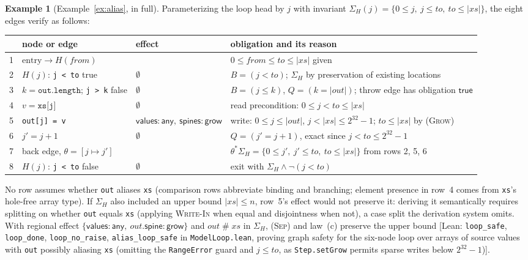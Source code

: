 \documentclass[10pt,a4paper]{article}
\theoremstyle{definition}
\newtheorem{example}[theorem]{Example}
\theoremstyle{remark}
\newcommand{\sep}{\mathrel{\#}}
\newcommand{\kw}[1]{\mathsf{#1}}
\newcommand{\grow}{\kw{grow}}
\newcommand{\any}{\kw{any}}
\newcommand{\val}{\kw{values}}
\newcommand{\st}{\kw{spines}}
\newcommand{\len}[1]{|#1|}
\newcommand{\code}[1]{\texttt{#1}}
\newcommand{\lean}[1]{\texttt{\small #1}}
\newcommand{\status}[1]{\textsf{\small[#1]}}
\begin{document}
\begin{example}[Example~\ref{ex:alias}, in full]\label{ex:full}
Parameterizing the loop head by $j$ with invariant
$\Sigma_H(j)=\{0\le j,\ j\le\mathit{to},\ \mathit{to}\le\len{\mathit{xs}}\}$,
the eight edges verify as follows:
{\footnotesize
\begin{center}
\begin{tabularx}{\linewidth}{@{}rll>{\raggedright\arraybackslash}X@{}}
\toprule
 & node or edge & effect & obligation and its reason\\
\midrule
1 & $\text{entry}\to H(\mathit{from})$ & & $0\le\mathit{from}\le\mathit{to}\le\len{\mathit{xs}}$ given\\
2 & $H(j)$: \code{j < to} true & $\emptyset$ & $B=(j<\mathit{to})$; $\Sigma_H$ by preservation of existing locations\\
3 & $k=\code{out.length}$; \code{j > k} false & $\emptyset$ & $B=(j\le k)$, $Q=(k=\len{\mathit{out}})$; throw edge has obligation $\kw{true}$\\
4 & $v=\code{xs[j]}$ & $\emptyset$ & read precondition: $0\le j<\mathit{to}\le\len{\mathit{xs}}$\\
5 & \code{out[j] = v} & $\val{:}\any,\ \st{:}\grow$ & write: $0\le j\le\len{\mathit{out}}$, $j<\len{\mathit{xs}}\le 2^{32}-1$; $\mathit{to}\le\len{\mathit{xs}}$ by \textsc{(Grow)}\\
6 & $j'=j+1$ & $\emptyset$ & $Q=(j'=j+1)$, exact since $j<\mathit{to}\le 2^{32}-1$\\
7 & back edge, $\theta=[j\mapsto j']$ & & $\theta^{*}\Sigma_H=\{0\le j',\ j'\le\mathit{to},\ \mathit{to}\le\len{\mathit{xs}}\}$ from rows 2, 5, 6\\
8 & $H(j)$: \code{j < to} false & $\emptyset$ & exit with $\Sigma_H\wedge\neg(j<\mathit{to})$\\
\bottomrule
\end{tabularx}
\end{center}}
\noindent
No row assumes whether \code{out} aliases \code{xs} (comparison rows
abbreviate binding and branching; element presence in row~4 comes from
\code{xs}'s hole-free array type). If $\Sigma_H$ also included an upper
bound $\len{\mathit{xs}}\le n$, row~5's effect would not preserve it:
deriving it semantically requires splitting on whether \code{out} equals
\code{xs} (applying \textsc{Write-In} when equal and disjointness when
not), a case split the derivation system omits. With regional effect
$\{\val:\any,\ \mathit{out}.\kw{spine}:\grow\}$ and $\mathit{out}\sep\mathit{xs}$
in $\Sigma_H$, \textsc{(Sep)} and law~(c) preserve the upper bound
\status{Lean: \lean{loop\_safe}, \lean{loop\_done}, \lean{loop\_no\_raise}, \lean{alias\_loop\_safe} in \lean{ModelLoop.lean}, proving graph safety for the six-node loop over arrays of source values with \code{out} possibly aliasing \code{xs} (omitting the \code{RangeError} guard and $j\le\mathit{to}$, as \lean{Step.setGrow} permits sparse writes below $2^{32}-1$)}.
\end{example}
\end{document}
